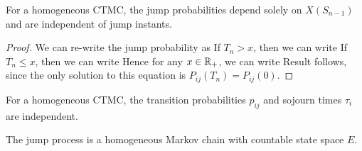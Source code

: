 \documentclass[a4paper,10pt,english]{article}
\begin{document}
\begin{lem}
\label{Lemma:JumpProb}
For a homogeneous CTMC, the jump probabilities depend solely on $X(S_{n-1})$ and are independent of jump instants.  
\end{lem}
\begin{proof}
We can re-write the jump probability as
If $T_n > x$, then we can write
If $T_n \leq x$, then we can write 
Hence for any $x \in \mathbb{R}_+$, we can write
Result follows, since the only solution to this equation is $P_{ij}(T_n) = P_{ij}(0)$. 
\end{proof}
\begin{cor} 
For a homogeneous CTMC, the transition probabilities $p_{ij}$ and sojourn times $\tau_i$ are independent. 
\end{cor}
\begin{cor}
The jump process is a homogeneous Markov chain with countable state space $E$. 
\end{cor}


\end{document}
